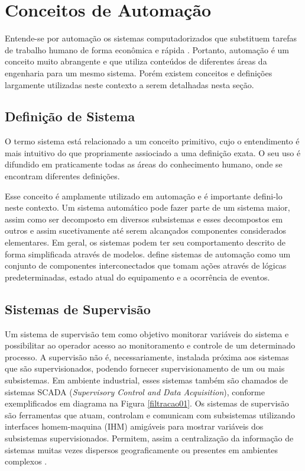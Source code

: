 		\section{Conceitos de Automação}
\label{sec:MTDs}

Entende-se por automação os sistemas computadorizados que substituem tarefas de trabalho humano de forma econômica e rápida \cite{Aguirre2007}. Portanto, automação é um conceito muito abrangente e que utiliza conteúdos de diferentes áreas da engenharia para um mesmo sistema. Porém existem conceitos e definições largamente utilizadas neste contexto a serem detalhadas nesta seção.


			\subsection{Definição de Sistema}
O termo sistema está relacionado a um conceito primitivo, cujo o entendimento é mais intuitivo do que propriamente assiociado a uma definição exata. O seu uso é difundido em praticamente todas as áreas do conhecimento humano, onde se encontram diferentes definições\cite{Aguirre2007}.

Esse conceito é amplamente utilizado em automação e é importante defini-lo neste contexto. Um sistema automático pode fazer parte de um sistema maior, assim como ser decomposto em diversos subsistemas e esses decompostos em outros e assim sucetivamente até serem alcançados componentes considerados elementares. Em geral, os sistemas podem ter seu comportamento descrito de forma simplificada através de modelos.  define sistemas de automação como um conjunto de componentes interconectados que tomam ações através de lógicas predeterminadas, estado atual do equipamento e a ocorrência de eventos.
				\subsection{Sistemas de Supervisão}
Um sistema de supervisão tem como objetivo monitorar variáveis do sistema e possibilitar ao operador acesso ao monitoramento e controle de um determinado processo. A supervisão não é, necessariamente, instalada próxima aos sistemas que são supervisionados, podendo fornecer supervisionamento de um ou mais subsistemas. Em ambiente industrial, esses sistemas também são chamados de sistemas SCADA (\emph{Supervisory Control and Data Acquisition}), conforme exemplificados em diagrama na Figura \ref{filtracao01}.
Os sistemas de supervisão são ferramentas que atuam, controlam e comunicam com subsistemas utilizando interfaces homem-maquina (IHM) amigáveis para mostrar variáveis dos subsistemas supervisionados. Permitem, assim a centralização da informação de sistemas muitas vezes dispersos geograficamente ou presentes em ambientes complexos \cite{Rosario2005}. 

